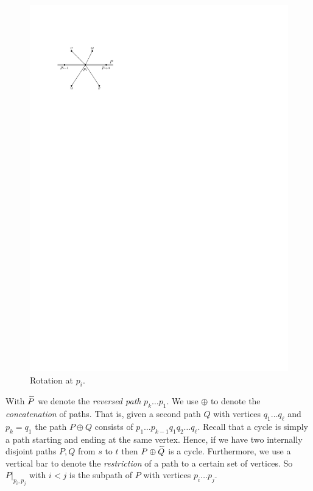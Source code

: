     \begin{figure}[b]
      \centering
      \includegraphics[scale=1]{unifiedAlgo/img/rightNeighbourwalk/rotation}
      \caption{Rotation at $p_i$.}
      \label{fig:right:rot}
    \end{figure}

    With $\accentset{\leftharpoonup}{P}$ we denote the \emph{reversed path} $p_k \ldots p_1$. We use $\oplus$ to denote the \emph{concatenation} of paths.
    That is, given a second path $Q$ with vertices $q_1 \ldots q_\ell$ and $p_k = q_1$ the path $P \oplus Q$ consists of $p_1 \ldots p_{k-1} q_1 q_2 \ldots q_\ell$.
    Recall that a cycle is simply a path starting and ending at the same vertex.
    Hence, if we have two internally disjoint paths $P, Q$ from $s$ to $t$ then $P \oplus \accentset{\leftharpoonup}{Q}$ is a cycle.
    Furthermore, we use a vertical bar to denote the \emph{restriction} of a path to a certain set of vertices. So $P|_{p_i, p_j}$ with $i<j$ is the subpath of $P$ with vertices $p_i \ldots p_j$.

